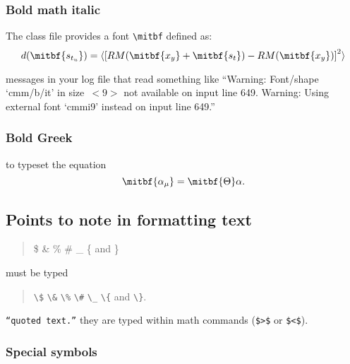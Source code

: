 \subsubsection{Bold math italic}\label{boldmathitalic}

The class file provides a font \verb"\mitbf" defined as:
\begin{equation}
  d(\mitbf{s_{t_u}}) = \langle {[RM(\mitbf{x_y} + \mitbf{s_t}) - RM(\mitbf{x_y})]}^2 \rangle
\end{equation}

messages in your log file that read something like ``Warning: Font/shape
`cmm/b/it' in size~\hbox{$< \!\! 9 \!\! >$} not available on input line 649.
Warning: Using external font `cmmi9' instead on input line 649.''


\subsubsection{Bold Greek}\label{boldgreek}

to typeset the equation \[ \mitbf{{\alpha_{\mu}}} = \mitbf{\Theta} \alpha. \]

\subsection{Points to note in formatting text}\label{formtext}

\begin{quote}
\$ \& \% \# \_ \{ and \}
\end{quote}
must be typed
\begin{center}
\begin{quote}
\verb"\$" \verb"\&" \verb"\%" \verb"\#" \verb"\_" \verb"\{" and \verb"\}".
\end{quote}
\end{center}

\texttt{``quoted text.''} they are typed within math commands (\verb"$>$" or \verb"$<$").

\subsubsection{Special symbols}

